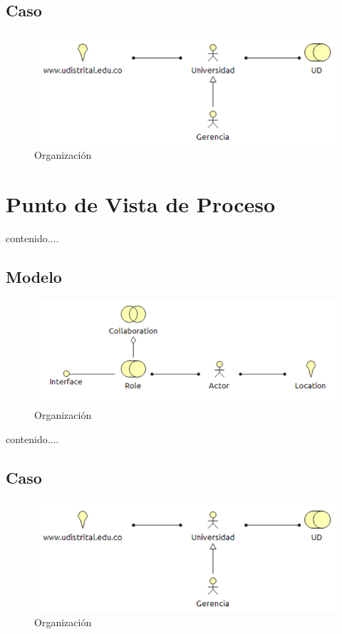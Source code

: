 \subsection{Caso}
\begin{figure}[th!]
	\centering
	\includegraphics[width=0.8\linewidth]{arquitectura_diseno/imgs/C_Organizacion}
	\caption{Organización}
\end{figure}
\newpage
\section{Punto de Vista de Proceso}
contenido....
\subsection{Modelo}
\begin{figure}[th!]
	\centering
	\includegraphics[width=0.8\linewidth]{arquitectura_diseno/imgs/M_Organizacion}
	\caption{Organización}
\end{figure}
\newpage
contenido....
\subsection{Caso}
\begin{figure}[th!]
	\centering
	\includegraphics[width=0.8\linewidth]{arquitectura_diseno/imgs/C_Organizacion}
	\caption{Organización}
\end{figure}
\newpage

